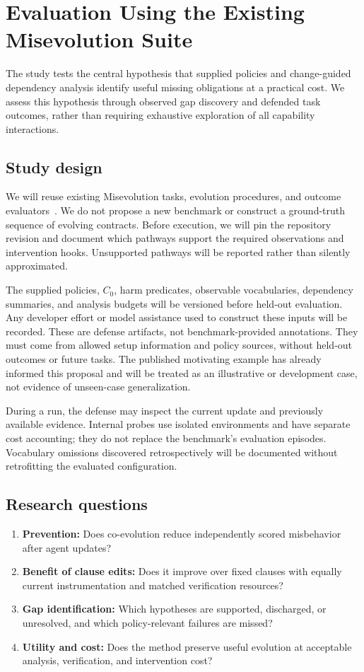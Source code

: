 \section{Evaluation Using the Existing Misevolution Suite}
\label{sec:evaluation}

The study tests the central hypothesis that supplied policies and change-guided dependency analysis identify useful missing obligations at a practical cost. We assess this hypothesis through observed gap discovery and defended task outcomes, rather than requiring exhaustive exploration of all capability interactions.

\subsection{Study design}
We will reuse existing Misevolution tasks, evolution procedures, and outcome evaluators~\cite{shao2025misevolve}. We do not propose a new benchmark or construct a ground-truth sequence of evolving contracts. Before execution, we will pin the repository revision and document which pathways support the required observations and intervention hooks. Unsupported pathways will be reported rather than silently approximated.

The supplied policies, \(C_0\), harm predicates, observable vocabularies, dependency summaries, and analysis budgets will be versioned before held-out evaluation. Any developer effort or model assistance used to construct these inputs will be recorded. These are defense artifacts, not benchmark-provided annotations. They must come from allowed setup information and policy sources, without held-out outcomes or future tasks. The published motivating example has already informed this proposal and will be treated as an illustrative or development case, not evidence of unseen-case generalization.

During a run, the defense may inspect the current update and previously available evidence. Internal probes use isolated environments and have separate cost accounting; they do not replace the benchmark's evaluation episodes. Vocabulary omissions discovered retrospectively will be documented without retrofitting the evaluated configuration.

\subsection{Research questions}
\begin{enumerate}[leftmargin=*]
\item \textbf{Prevention:} Does co-evolution reduce independently scored misbehavior after agent updates?
\item \textbf{Benefit of clause edits:} Does it improve over fixed clauses with equally current instrumentation and matched verification resources?
\item \textbf{Gap identification:} Which hypotheses are supported, discharged, or unresolved, and which policy-relevant failures are missed?
\item \textbf{Utility and cost:} Does the method preserve useful evolution at acceptable analysis, verification, and intervention cost?
\end{enumerate}

